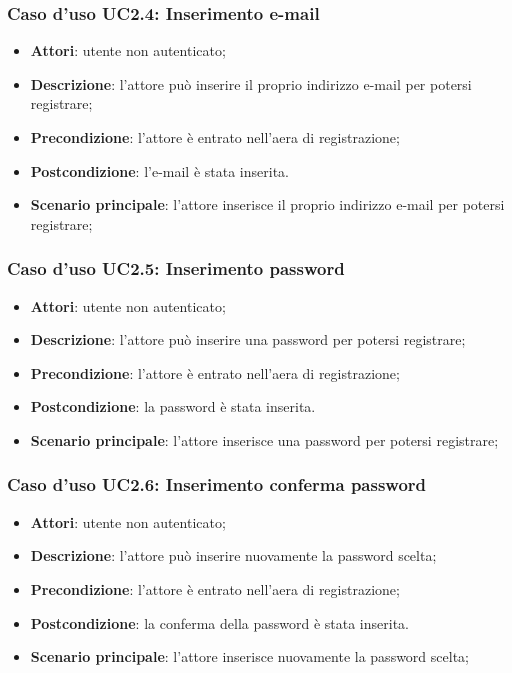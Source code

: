 \subsubsection{Caso d'uso UC2.4: Inserimento e-mail}
\begin{itemize}
\item \textbf{Attori}: utente non autenticato;
\item \textbf{Descrizione}: l'attore può inserire il proprio indirizzo e-mail per potersi registrare;
\item \textbf{Precondizione}: l'attore è entrato nell'aera di registrazione;
\item \textbf{Postcondizione}: l'e-mail è stata inserita.
\item \textbf{Scenario principale}: l'attore inserisce il proprio indirizzo e-mail per potersi registrare; 
\end{itemize}

\subsubsection{Caso d'uso UC2.5: Inserimento password}
\begin{itemize}
\item \textbf{Attori}: utente non autenticato;
\item \textbf{Descrizione}: l'attore può inserire una password per potersi registrare;
\item \textbf{Precondizione}: l'attore è entrato nell'aera di registrazione;
\item \textbf{Postcondizione}: la password è stata inserita.
\item \textbf{Scenario principale}: l'attore inserisce una password per potersi registrare;
\end{itemize}

\subsubsection{Caso d'uso UC2.6: Inserimento conferma password}
\begin{itemize}
\item \textbf{Attori}: utente non autenticato;
\item \textbf{Descrizione}: l'attore può inserire nuovamente la password scelta;
\item \textbf{Precondizione}: l'attore è entrato nell'aera di registrazione;
\item \textbf{Postcondizione}: la conferma della password è stata inserita.
\item \textbf{Scenario principale}: l'attore inserisce nuovamente la password scelta;
\end{itemize}

